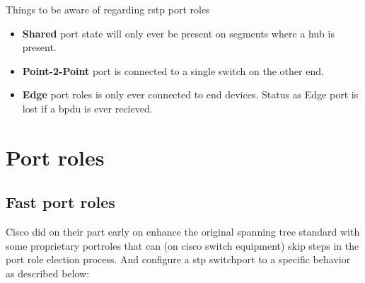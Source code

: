 

Things to be aware of regarding \gls{rstp} port roles
\begin{itemize}
    \item \textbf{Shared} port state will only ever be present on segments where a hub is present.
    \item \textbf{Point-2-Point} port is connected to a single switch on the other end.
    \item \textbf{Edge} port roles is only ever connected to end devices. Status as Edge port is lost if a \gls{bpdu} is ever recieved.
\end{itemize}


\section{Port roles}

\subsection{Fast port roles}
Cisco did on their part early on enhance the original spanning tree standard with some proprietary portroles that can (on cisco switch equipment) skip steps in the port role election process. And configure a \gls{stp} switchport to a specific behavior as described below:

